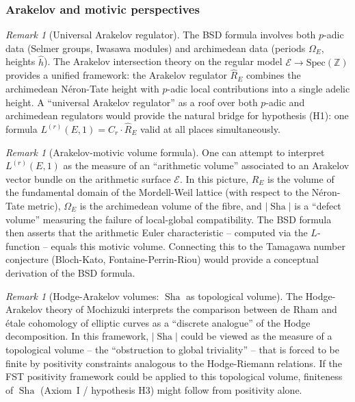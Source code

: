 \documentclass[aps,prd,twocolumn,superscriptaddress,nofootinbib]{revtex4-2}
\theoremstyle{definition}
\theoremstyle{remark}
\newtheorem{remark}[theorem]{Remark}
\DeclareMathOperator{\Sha}{Sha}
\begin{document}
\subsubsection{Arakelov and motivic perspectives}

\begin{remark}[Universal Arakelov regulator]
\label{rem:arakelov-regulator}
The BSD formula involves both $p$-adic data (Selmer groups, Iwasawa modules) and archimedean data (periods $\Omega_E$, heights $\hat{h}$). The Arakelov intersection theory on the regular model $\mathcal{E} \to \mathrm{Spec}(\mathbb{Z})$ provides a unified framework: the Arakelov regulator $\hat{R}_E$ combines the archimedean N\'eron-Tate height with $p$-adic local contributions into a single adelic height. A ``universal Arakelov regulator'' as a roof over both $p$-adic and archimedean regulators would provide the natural bridge for hypothesis (H1): one formula $L^{(r)}(E,1) = C_r \cdot \hat{R}_E$ valid at all places simultaneously.
\end{remark}

\begin{remark}[Arakelov-motivic volume formula]
\label{rem:arakelov-volume}
One can attempt to interpret $L^{(r)}(E,1)$ as the measure of an ``arithmetic volume'' associated to an Arakelov vector bundle on the arithmetic surface $\mathcal{E}$. In this picture, $R_E$ is the volume of the fundamental domain of the Mordell-Weil lattice (with respect to the N\'eron-Tate metric), $\Omega_E$ is the archimedean volume of the fibre, and $|\Sha|$ is a ``defect volume'' measuring the failure of local-global compatibility. The BSD formula then asserts that the arithmetic Euler characteristic -- computed via the $L$-function -- equals this motivic volume. Connecting this to the Tamagawa number conjecture (Bloch-Kato, Fontaine-Perrin-Riou) would provide a conceptual derivation of the BSD formula.
\end{remark}

\begin{remark}[Hodge-Arakelov volumes: $\Sha$ as topological volume]
\label{rem:hodge-arakelov-sha}
The Hodge-Arakelov theory of Mochizuki interprets the comparison between de Rham and \'etale cohomology of elliptic curves as a ``discrete analogue'' of the Hodge decomposition. In this framework, $|\Sha|$ could be viewed as the measure of a topological volume -- the ``obstruction to global triviality'' -- that is forced to be finite by positivity constraints analogous to the Hodge-Riemann relations. If the FST positivity framework could be applied to this topological volume, finiteness of $\Sha$ (Axiom~I / hypothesis H3) might follow from positivity alone.
\end{remark}
\end{document}
